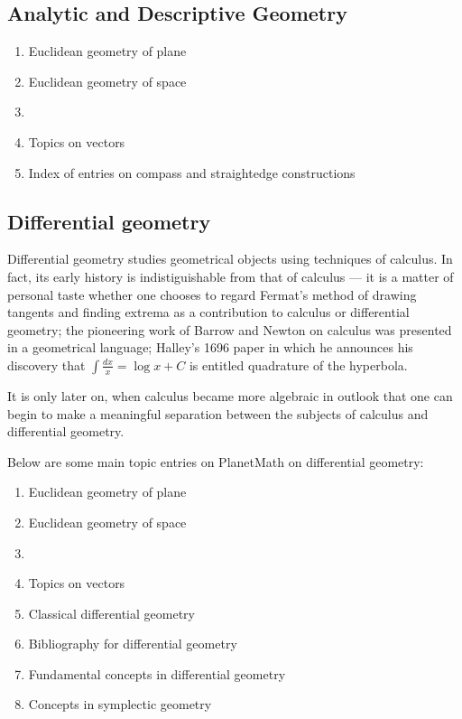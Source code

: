 \documentclass[12pt]{article}
\begin{document}
\subsection{}

\subsection{Analytic and Descriptive Geometry}
\begin{enumerate}
\item Euclidean geometry of plane
\item Euclidean geometry of space
\item {}
\item Topics on vectors
\item Index of entries on compass and straightedge constructions
\end{enumerate}

\subsection{}

\subsection{Differential geometry}

Differential geometry studies geometrical objects using techniques of
calculus.  In fact, its early history is indistiguishable from that of
calculus --- it is a matter of personal taste whether one chooses to
regard Fermat's method of drawing tangents and finding extrema as a
contribution to calculus or differential geometry; the pioneering work
of Barrow and Newton on calculus was presented in a geometrical
language; Halley's 1696 paper in which he announces his discovery that
$\displaystyle \int \frac{dx}{x} = \log x + C$ is entitled quadrature of the hyperbola.

It is only later on, when calculus became more algebraic in outlook
that one can begin to make a meaningful separation between the
subjects of calculus and differential geometry.

Below are some main topic entries on PlanetMath on differential geometry:
\begin{enumerate}
\item Euclidean geometry of plane
\item Euclidean geometry of space
\item {}
\item Topics on vectors
\item Classical differential geometry 
\item Bibliography for differential geometry
\item Fundamental concepts in differential geometry
\item Concepts in symplectic geometry
\end{enumerate}
\end{document}
